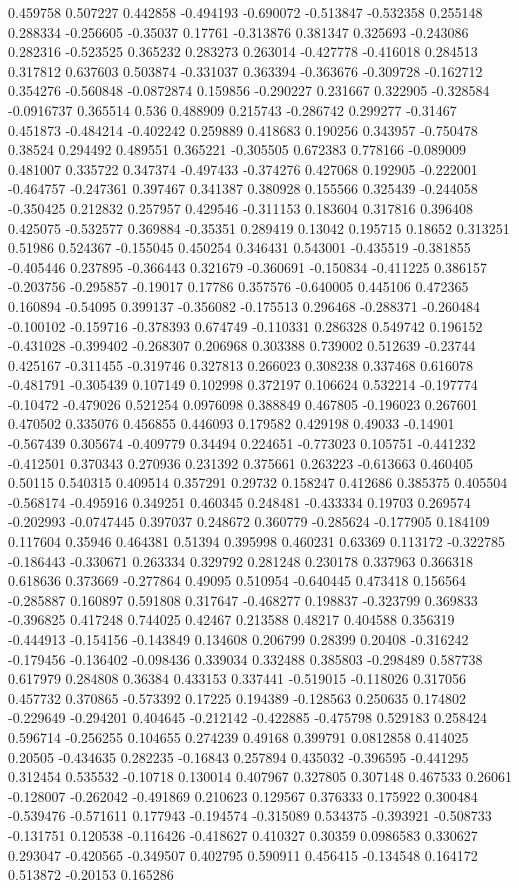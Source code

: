 0.459758 0.507227 0.442858 -0.494193 -0.690072 -0.513847 -0.532358 0.255148 0.288334 -0.256605 -0.35037 0.17761 -0.313876 0.381347 0.325693 -0.243086 0.282316 -0.523525 0.365232 0.283273 0.263014 -0.427778 -0.416018 0.284513 0.317812 0.637603 0.503874 -0.331037 0.363394 -0.363676 -0.309728 -0.162712 0.354276 -0.560848 -0.0872874 0.159856 -0.290227 0.231667 0.322905 -0.328584 -0.0916737 0.365514 0.536 0.488909 0.215743 -0.286742 0.299277 -0.31467 0.451873 -0.484214 -0.402242 0.259889 0.418683 0.190256 0.343957 -0.750478 0.38524 0.294492 0.489551 0.365221 -0.305505 0.672383 0.778166 -0.089009 0.481007 0.335722 0.347374 -0.497433 -0.374276 0.427068 0.192905 -0.222001 -0.464757 -0.247361 0.397467 0.341387 0.380928 0.155566 0.325439 -0.244058 -0.350425 0.212832 0.257957 0.429546 -0.311153 0.183604 0.317816 0.396408 0.425075 -0.532577 0.369884 -0.35351 0.289419 0.13042 0.195715 0.18652 0.313251 0.51986 0.524367 -0.155045 0.450254 0.346431 0.543001 -0.435519 -0.381855 -0.405446 0.237895 -0.366443 0.321679 -0.360691 -0.150834 -0.411225 0.386157 -0.203756 -0.295857 -0.19017 0.17786 0.357576 -0.640005 0.445106 0.472365 0.160894 -0.54095 0.399137 -0.356082 -0.175513 0.296468 -0.288371 -0.260484 -0.100102 -0.159716 -0.378393 0.674749 -0.110331 0.286328 0.549742 0.196152 -0.431028 -0.399402 -0.268307 0.206968 0.303388 0.739002 0.512639 -0.23744 0.425167 -0.311455 -0.319746 0.327813 0.266023 0.308238 0.337468 0.616078 -0.481791 -0.305439 0.107149 0.102998 0.372197 0.106624 0.532214 -0.197774 -0.10472 -0.479026 0.521254 0.0976098 0.388849 0.467805 -0.196023 0.267601 0.470502 0.335076 0.456855 0.446093 0.179582 0.429198 0.49033 -0.14901 -0.567439 0.305674 -0.409779 0.34494 0.224651 -0.773023 0.105751 -0.441232 -0.412501 0.370343 0.270936 0.231392 0.375661 0.263223 -0.613663 0.460405 0.50115 0.540315 0.409514 0.357291 0.29732 0.158247 0.412686 0.385375 0.405504 -0.568174 -0.495916 0.349251 0.460345 0.248481 -0.433334 0.19703 0.269574 -0.202993 -0.0747445 0.397037 0.248672 0.360779 -0.285624 -0.177905 0.184109 0.117604 0.35946 0.464381 0.51394 0.395998 0.460231 0.63369 0.113172 -0.322785 -0.186443 -0.330671 0.263334 0.329792 0.281248 0.230178 0.337963 0.366318 0.618636 0.373669 -0.277864 0.49095 0.510954 -0.640445 0.473418 0.156564 -0.285887 0.160897 0.591808 0.317647 -0.468277 0.198837 -0.323799 0.369833 -0.396825 0.417248 0.744025 0.42467 0.213588 0.48217 0.404588 0.356319 -0.444913 -0.154156 -0.143849 0.134608 0.206799 0.28399 0.20408 -0.316242 -0.179456 -0.136402 -0.098436 0.339034 0.332488 0.385803 -0.298489 0.587738 0.617979 0.284808 0.36384 0.433153 0.337441 -0.519015 -0.118026 0.317056 0.457732 0.370865 -0.573392 0.17225 0.194389 -0.128563 0.250635 0.174802 -0.229649 -0.294201 0.404645 -0.212142 -0.422885 -0.475798 0.529183 0.258424 0.596714 -0.256255 0.104655 0.274239 0.49168 0.399791 0.0812858 0.414025 0.20505 -0.434635 0.282235 -0.16843 0.257894 0.435032 -0.396595 -0.441295 0.312454 0.535532 -0.10718 0.130014 0.407967 0.327805 0.307148 0.467533 0.26061 -0.128007 -0.262042 -0.491869 0.210623 0.129567 0.376333 0.175922 0.300484 -0.539476 -0.571611 0.177943 -0.194574 -0.315089 0.534375 -0.393921 -0.508733 -0.131751 0.120538 -0.116426 -0.418627 0.410327 0.30359 0.0986583 0.330627 0.293047 -0.420565 -0.349507 0.402795 0.590911 0.456415 -0.134548 0.164172 0.513872 -0.20153 0.165286 
